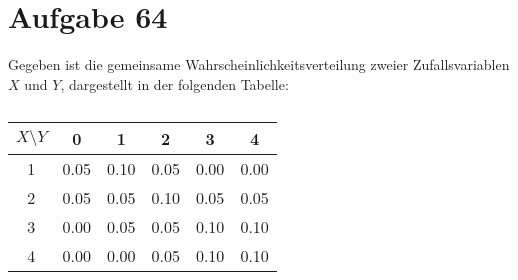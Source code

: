 \section{Aufgabe 64}
\setcounter{section}{64}

Gegeben ist die gemeinsame Wahrscheinlichkeitsverteilung zweier
Zufallsvariablen $X$ und $Y$, dargestellt in der folgenden Tabelle:
\begin{table}[h]
    \centering
    \renewcommand{\arraystretch}{1.5}
    \begin{tabular}{c|c|c|c|c|c}
        $X \setminus Y$ & 0    & 1    & 2    & 3    & 4    \\ \hline
        1               & 0.05 & 0.10 & 0.05 & 0.00 & 0.00 \\
        2               & 0.05 & 0.05 & 0.10 & 0.05 & 0.05 \\
        3               & 0.00 & 0.05 & 0.05 & 0.10 & 0.10 \\
        4               & 0.00 & 0.00 & 0.05 & 0.10 & 0.10
    \end{tabular}
    \caption{}
\end{table}
